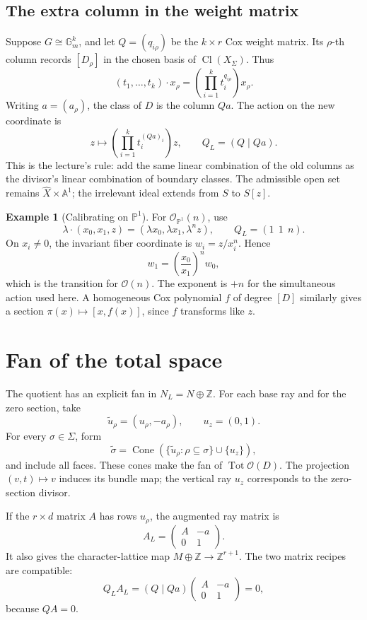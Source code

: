 \documentclass[11pt]{article}
\theoremstyle{definition}
\newtheorem{Ex}{Example}
\theoremstyle{remark}
\DeclareMathOperator{\Cl}{Cl}
\DeclareMathOperator{\Tot}{Tot}
\newcommand{\A}{\mathbb A}
\newcommand{\Pj}{\mathbb P}
\newcommand{\Z}{\mathbb Z}
\newcommand{\Gm}{\mathbb G_m}
\newcommand{\OO}{\mathcal O}
\newcommand{\Cone}[1]{\operatorname{Cone}(#1)}
\begin{document}
\subsection{The extra column in the weight matrix}

Suppose \(G\cong\Gm^k\), and let \(Q=(q_{i\rho})\) be the
\(k\times r\) Cox weight matrix. Its \(\rho\)-th column records
\([D_\rho]\) in the chosen basis of \(\Cl(X_\Sigma)\). Thus
\[
(t_1,\ldots,t_k)\cdot x_\rho
=\left(\prod_{i=1}^k t_i^{q_{i\rho}}\right)x_\rho.
\]
Writing \(a=(a_\rho)\), the class of \(D\) is the column \(Qa\).
The action on the new coordinate is
\[
z\longmapsto\left(\prod_{i=1}^k t_i^{(Qa)_i}\right)z,
\qquad
\boxed{Q_L=(Q\mid Qa).}
\]
This is the lecture's rule: add the same linear combination of the
old columns as the divisor's linear combination of boundary classes.
The admissible open set remains \(\widehat X\times\A^1\);
the irrelevant ideal extends from \(S\) to \(S[z]\).

\begin{Ex}[Calibrating on \(\Pj^1\)]
For \(\OO_{\Pj^1}(n)\), use
\[
\lambda\cdot(x_0,x_1,z)
=(\lambda x_0,\lambda x_1,\lambda^n z),
\qquad Q_L=(1\ \ 1\ \ n).
\]
On \(x_i\ne0\), the invariant fiber coordinate is
\(w_i=z/x_i^n\). Hence
\[
w_1=\left(\frac{x_0}{x_1}\right)^n w_0,
\]
which is the transition for \(\OO(n)\). The exponent is \(+n\)
for the simultaneous action used here. A homogeneous Cox polynomial
\(f\) of degree \([D]\) similarly gives a section
\(\pi(x)\mapsto[x,f(x)]\), since \(f\) transforms like \(z\).
\end{Ex}

\section{Fan of the total space}
\label{sec:nov02-line-bundle-fan}

The quotient has an explicit fan in
\(N_L=N\oplus\Z\). For each base ray and for the zero section, take
\[
\widetilde u_\rho=(u_\rho,-a_\rho),\qquad
u_z=(0,1).
\]
For every \(\sigma\in\Sigma\), form
\[
\widetilde\sigma=
\Cone{\{\widetilde u_\rho:\rho\subseteq\sigma\}\cup\{u_z\}},
\]
and include all faces. These cones make the fan of \(\Tot\OO(D)\).
The projection \((v,t)\mapsto v\) induces its bundle map; the
vertical ray \(u_z\) corresponds to the zero-section divisor.

If the \(r\times d\) matrix \(A\) has rows \(u_\rho\), the
augmented ray matrix is
\[
\boxed{
A_L=
\begin{pmatrix}
 A&-a\\
 0&1
\end{pmatrix}.
}
\]
It also gives the character-lattice map
\(M\oplus\Z\to\Z^{r+1}\). The two matrix recipes are compatible:
\[
Q_LA_L=(Q\mid Qa)
\begin{pmatrix}A&-a\\0&1\end{pmatrix}=0,
\]
because \(QA=0\).
\end{document}
